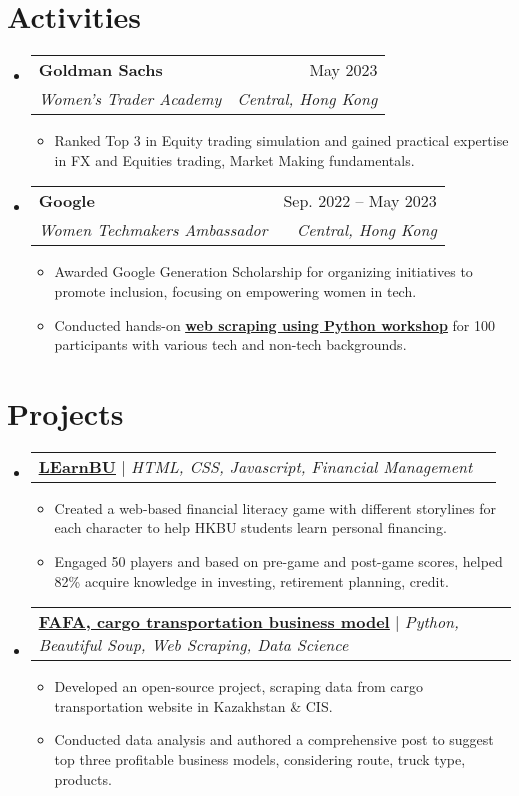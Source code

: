 \documentclass[letterpaper,10.5pt]{article}
\makeatletter
\newcommand{\resumeItem}[1]{
  \item\small{
    {#1 \vspace{-2pt}}
  }
}
\newcommand{\resumeSubheading}[4]{
  \vspace{-2pt}\item
    \begin{tabular*}{1\textwidth}[t]{l@{\extracolsep{\fill}}r}
      \textbf{#1} & #2 \\
      \textit{\small#3} & \textit{\small #4} \\
    \end{tabular*}\vspace{-7pt}
}
\newcommand{\resumeSubSubheading}[2]{
    \item
    \begin{tabular*}{1\textwidth}{l@{\extracolsep{\fill}}r}
      \textit{\small#1} & \textit{\small #2} \\
    \end{tabular*}\vspace{-7pt}
}
\newcommand{\resumeProjectHeading}[2]{
    \item
    \begin{tabular*}{1\textwidth}{l@{\extracolsep{\fill}}r}
      \small#1 & #2 \\
    \end{tabular*}\vspace{-7pt}
}
\newcommand{\resumeSubHeadingListStart}{\begin{itemize}[leftmargin=0.0in, label={}]}
\newcommand{\resumeSubHeadingListEnd}{\end{itemize}}
\newcommand{\resumeItemListStart}{\begin{itemize}}
\newcommand{\resumeItemListEnd}{\end{itemize}\vspace{-5pt}}
\makeatother
\begin{document}
\section{Activities}
  \resumeSubHeadingListStart
    \resumeSubheading
      {Goldman Sachs}{May 2023}
      {Women’s Trader Academy}{Central, Hong Kong}
      \resumeItemListStart
        \resumeItem{Ranked Top 3 in Equity trading simulation and gained practical expertise in FX and Equities trading, Market Making fundamentals.}
      \resumeItemListEnd
       \resumeSubheading
      {Google}{Sep. 2022 -- May 2023}
      {Women Techmakers Ambassador}{Central, Hong Kong}
      \resumeItemListStart
        \resumeItem{Awarded Google Generation Scholarship for organizing initiatives to promote inclusion, focusing on empowering women in tech.}
        \resumeItem{Conducted hands-on \underline{\href{https://www.linkedin.com/posts/ayazhankad_today-i-was-the-speaker-for-the-hands-on-activity-7038903549317050368-JdYM?utm_source=share&utm_medium=member_desktop}{\textbf{web scraping using Python workshop}}} for 100 participants with various tech and non-tech backgrounds. }
      \resumeItemListEnd
\resumeSubHeadingListEnd
      

\section{Projects}
    \resumeSubHeadingListStart
      \resumeProjectHeading
{\underline{\href{https://github.com/ayazhankadessova/FinanceGame}{\textbf{LEarnBU}}} $|$ \emph{HTML, CSS, Javascript, Financial Management}}{}
          \resumeItemListStart
            \resumeItem{Created a web-based financial literacy game with different storylines for each character to help HKBU students learn personal financing. }
            \resumeItem{Engaged 50 players and based on pre-game and post-game scores, helped 82\% acquire knowledge in investing, retirement planning, credit.}
          \resumeItemListEnd
      \resumeProjectHeading
      {\underline{\href{https://ayazhankad-coding.blogspot.com/2021/09/scraping-fafakz-for-almaty-delivery.html}{\textbf{FAFA, cargo transportation business model}}} $|$ \emph{Python, Beautiful Soup, Web Scraping, Data Science}}{}
          \resumeItemListStart
            \resumeItem{Developed an open-source project, scraping data from cargo transportation website in Kazakhstan \& CIS.}
            \resumeItem{Conducted data analysis and authored a comprehensive post to suggest top three profitable business models, considering route, truck type, products.}
          \resumeItemListEnd
    \resumeSubHeadingListEnd
%
\end{document}
